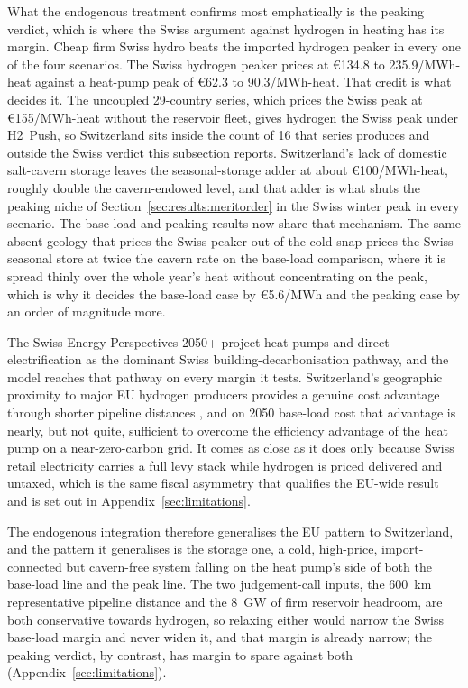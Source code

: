 What the endogenous treatment confirms most emphatically is the peaking verdict,
which is where the Swiss argument against hydrogen in heating has its margin. Cheap
firm Swiss hydro beats the imported hydrogen peaker in every one of the four
scenarios. The Swiss hydrogen peaker prices at \euro{}134.8 to 235.9/MWh-heat against a
heat-pump peak of \euro{}62.3 to 90.3/MWh-heat. That credit is what decides it. The
uncoupled 29-country series, which prices the Swiss peak at \euro{}155/MWh-heat without
the reservoir fleet, gives hydrogen the Swiss peak under H2~Push, so Switzerland sits
inside the count of 16 that series produces and outside the Swiss verdict this
subsection reports.
Switzerland's lack of domestic salt-cavern storage leaves the seasonal-storage
adder at about \euro{}100/MWh-heat, roughly double the cavern-endowed level, and
that adder is what shuts the peaking niche of
Section~\ref{sec:results:meritorder} in the Swiss winter peak in every scenario.
The base-load and peaking results now share that mechanism. The same absent geology that prices the Swiss peaker out of the
cold snap prices the Swiss seasonal store at twice the cavern rate on the base-load
comparison, where it is spread thinly over the whole year's heat without concentrating on the peak, which is why it decides the base-load case by
\euro{}5.6/MWh and the peaking case by an order of magnitude more.

The Swiss Energy Perspectives 2050+ \citep{SFOE2023perspectives} project heat pumps and
direct electrification as the dominant Swiss building-decarbonisation pathway, and the
model reaches that pathway on every margin it tests. Switzerland's geographic proximity
to major EU hydrogen producers provides a genuine cost advantage through shorter
pipeline distances \citep{OIES2024hydrogenimportsET32}, and on 2050 base-load cost that
advantage is nearly, but not quite, sufficient to overcome the efficiency advantage of
the heat pump on a near-zero-carbon grid. It comes as close as it does only because
Swiss retail electricity carries a full levy stack while hydrogen is priced delivered and
untaxed, which is the same fiscal asymmetry that
qualifies the EU-wide result and is set out in Appendix~\ref{sec:limitations}.

The endogenous integration therefore generalises the EU pattern to Switzerland, and the
pattern it generalises is the storage one, a cold, high-price, import-connected but
cavern-free system falling on the heat pump's side of both the base-load line and the
peak line. The two judgement-call inputs, the 600~km representative pipeline distance
and the 8~GW of firm reservoir headroom, are both conservative towards hydrogen, so
relaxing either would narrow the Swiss base-load margin and never widen it, and that
margin is already narrow; the peaking verdict, by contrast, has margin to spare against
both (Appendix~\ref{sec:limitations}).

